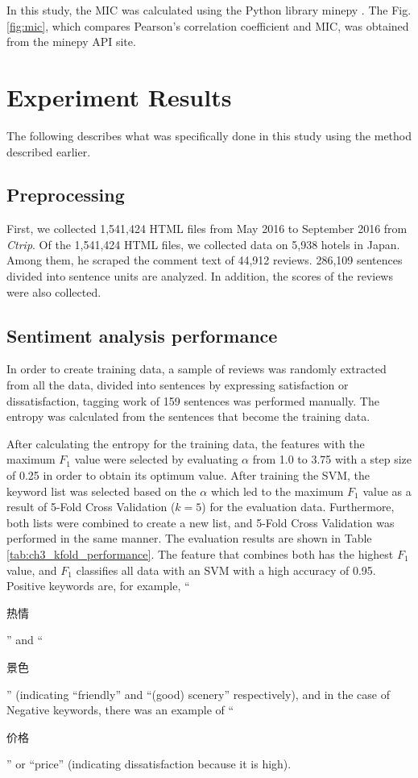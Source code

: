 \documentclass[review]{elsarticle}
\begin{document}
In this study, the MIC was calculated using the Python library minepy \cite[][]{Albanese2012}. The Fig. \ref{fig:mic}, which compares Pearson's correlation coefficient and MIC, was obtained from the minepy API site.

\section{Experiment Results}\label{results}

The following describes what was specifically done in this study using the method described earlier.

\subsection{Preprocessing}\label{res_preprocessing}

First, we collected 1,541,424 HTML files from May 2016 to September 2016 from \textit{Ctrip}. Of the 1,541,424 HTML files, we collected data on 5,938 hotels in Japan. Among them, he scraped the comment text of 44,912 reviews. 286,109 sentences divided into sentence units are analyzed. In addition, the scores of the reviews were also collected.

\subsection{Sentiment analysis performance}\label{res_sentiment_analysis}

In order to create training data, a sample of reviews was randomly extracted from all the data, divided into sentences by expressing satisfaction or dissatisfaction, tagging work of 159 sentences was performed manually. The entropy was calculated from the sentences that become the training data.

After calculating the entropy for the training data, the features with the maximum \(F_1\) value were selected by evaluating \(\alpha\) from 1.0 to 3.75 with a step size of 0.25 in order to obtain its optimum value. After training the SVM, the keyword list was selected based on the \(\alpha\) which led to the maximum \(F_1\) value as a result of 5-Fold Cross Validation (\(k = 5\)) for the evaluation data. Furthermore, both lists were combined to create a new list, and 5-Fold Cross Validation was performed in the same manner. The evaluation results are shown in Table \ref{tab:ch3_kfold_performance}. The feature that combines both has the highest \(F_1\) value, and \(F_1\) classifies all data with an SVM with a high accuracy of 0.95. Positive keywords are, for example, ``\begin{CJK}{UTF8}{min}热情\end{CJK}'' and ``\begin{CJK}{UTF8}{min}景色\end{CJK}'' (indicating ``friendly'' and ``(good) scenery'' respectively), and in the case of Negative keywords, there was an example of ``\begin{CJK}{UTF8}{min}价格\end{CJK}'' or ``price'' (indicating dissatisfaction because it is high).
\end{document}
